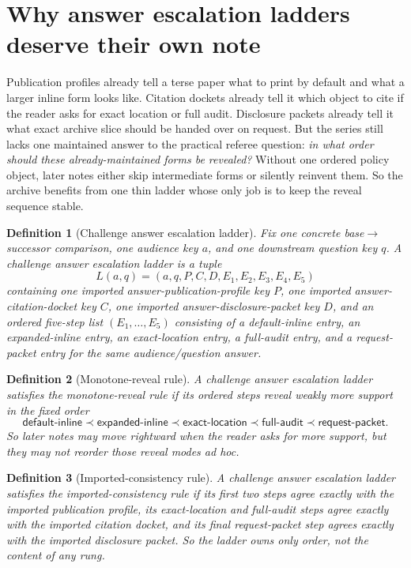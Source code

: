 \documentclass[11pt]{article}
\newtheorem{definition}{Definition}
\begin{document}
\section{Why answer escalation ladders deserve their own note}
Publication profiles already tell a terse paper what to print by default and what a larger inline form looks like.
Citation dockets already tell it which object to cite if the reader asks for exact location or full audit.
Disclosure packets already tell it what exact archive slice should be handed over on request.
But the series still lacks one maintained answer to the practical referee question: \emph{in what order should these already-maintained forms be revealed?}
Without one ordered policy object, later notes either skip intermediate forms or silently reinvent them.
So the archive benefits from one thin ladder whose only job is to keep the reveal sequence stable.

\begin{definition}[Challenge answer escalation ladder]
Fix one concrete base$\to$successor comparison, one audience key $a$, and one downstream question key $q$.
A \emph{challenge answer escalation ladder} is a tuple
\[
L(a,q)=(a,q,P,C,D,E_1,E_2,E_3,E_4,E_5)
\]
containing one imported answer-publication-profile key $P$, one imported answer-citation-docket key $C$, one imported answer-disclosure-packet key $D$, and an ordered five-step list $(E_1,\dots,E_5)$ consisting of a default-inline entry, an expanded-inline entry, an exact-location entry, a full-audit entry, and a request-packet entry for the same audience/question answer.
\end{definition}

\begin{definition}[Monotone-reveal rule]
A challenge answer escalation ladder satisfies the \emph{monotone-reveal rule} if its ordered steps reveal weakly more support in the fixed order
\[
\textsf{default-inline} \prec \textsf{expanded-inline} \prec \textsf{exact-location} \prec \textsf{full-audit} \prec \textsf{request-packet}.
\]
So later notes may move rightward when the reader asks for more support, but they may not reorder those reveal modes ad hoc.
\end{definition}

\begin{definition}[Imported-consistency rule]
A challenge answer escalation ladder satisfies the \emph{imported-consistency rule} if its first two steps agree exactly with the imported publication profile, its exact-location and full-audit steps agree exactly with the imported citation docket, and its final request-packet step agrees exactly with the imported disclosure packet.
So the ladder owns only order, not the content of any rung.
\end{definition}
\end{document}
